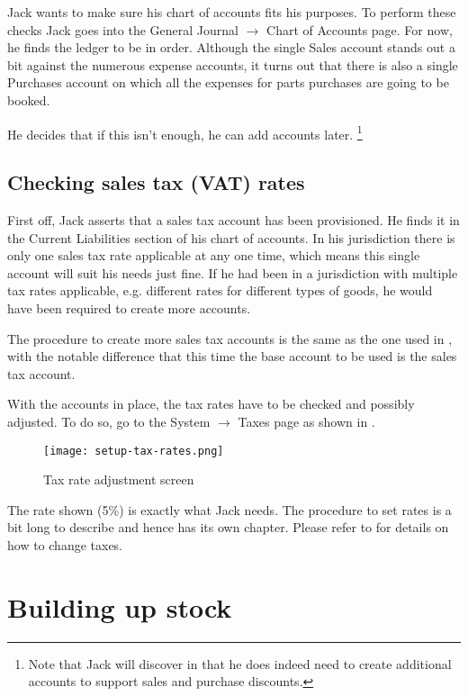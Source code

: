 Jack wants to make sure his chart of accounts fits his purposes. To perform these
checks Jack goes into the General Journal $\rightarrow$ Chart of Accounts page. For now, he finds
the ledger to be in order. Although the single Sales account stands out a bit against
the numerous expense accounts, it turns out that there is also a single Purchases
account on which all the expenses for parts purchases are going to be booked.

He decides that if this isn't enough, he can add accounts later.
\footnote{Note that Jack will discover in  that
he does indeed need to create additional accounts to support sales and
purchase discounts.}


\section{Checking sales tax (VAT) rates}
\label{sec-first-login-checking-tax-rates}

First off, Jack asserts that a sales tax account has been provisioned. He finds it
in the Current Liabilities section of his chart of accounts. In his jurisdiction there
is only one sales tax rate applicable at any one time, which means this single account
will suit his needs just fine. If he had been in a jurisdiction with multiple tax rates
applicable, e.g. different rates for different types of goods, he would have been
required to create more accounts.

The procedure to create more sales tax accounts is the same as the one used in
, with the notable difference that this time the base account
to be used is the sales tax account.

With the accounts in place, the tax rates have to be checked and possibly adjusted.
To do so, go to the System $\rightarrow$ Taxes page as shown in .

\begin{figure}[h]
\texttt{[image: setup-tax-rates.png]}
\caption{Tax rate adjustment screen}
\label{fig:setup-tax-rates}
\end{figure}

The rate shown (5\%) is exactly what Jack needs. The procedure to set rates is a bit
long to describe and hence has its own chapter. Please refer to  for
details on how to change taxes.

\chapter{Building up stock}
\label{cha-building-up-stock}

